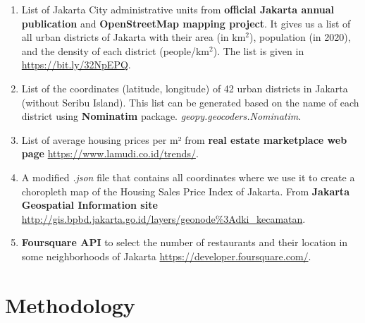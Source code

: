 \documentclass[12pt,a4paper]{article}
\begin{document}
\begin{enumerate}
\item List of Jakarta City administrative units from \textbf{official Jakarta annual publication} and \textbf{OpenStreetMap mapping project}. It gives us a list of all urban districts of Jakarta with their area (in km$^2$), population (in 2020), and the density of each district (people/km$^2$). The list is given in \url{https://bit.ly/32NpEPQ}.
\item List of the coordinates (latitude, longitude) of 42 urban districts in Jakarta (without Seribu Island). This list can be generated based on the name of each district using \textbf{Nominatim} package. \textit{geopy.geocoders.Nominatim}.
\item List of average housing prices per m² from \textbf{real estate marketplace web page} \url{https://www.lamudi.co.id/trends/}.
\item A modified \textit{.json} file that contains all coordinates where we use it to create a choropleth map of the Housing Sales Price Index of Jakarta. From \textbf{Jakarta Geospatial Information site} \url{http://gis.bpbd.jakarta.go.id/layers/geonode%3Adki_kecamatan}.
\item \textbf{Foursquare API} to select the number of restaurants and their location in some neighborhoods of Jakarta \url{https://developer.foursquare.com/}.
\end{enumerate}

\section{Methodology}
\label{sec:method}
\end{document}
